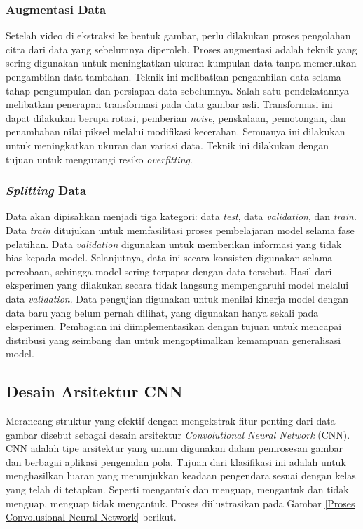 \subsubsection{Augmentasi Data}

    Setelah video di ekstraksi ke bentuk gambar, perlu dilakukan proses pengolahan citra dari data yang sebelumnya diperoleh. Proses augmentasi adalah teknik yang sering digunakan untuk meningkatkan ukuran kumpulan data tanpa memerlukan pengambilan data tambahan. Teknik ini melibatkan pengambilan data selama tahap pengumpulan dan persiapan data sebelumnya. Salah satu pendekatannya melibatkan penerapan transformasi pada data gambar asli. Transformasi ini dapat dilakukan berupa rotasi, pemberian \textit{noise}, penskalaan, pemotongan, dan penambahan nilai piksel melalui modifikasi kecerahan. Semuanya ini dilakukan untuk meningkatkan ukuran dan variasi data. Teknik ini dilakukan dengan tujuan untuk mengurangi resiko \textit{overfitting}.

\subsubsection{\textit{Splitting} Data}
   Data akan dipisahkan menjadi tiga kategori: data \textit{test}, data \textit{validation}, dan \textit{train}. Data \textit{train} ditujukan untuk memfasilitasi proses pembelajaran model selama fase pelatihan. Data \textit{validation} digunakan untuk memberikan informasi yang tidak bias kepada model. Selanjutnya, data ini secara konsisten digunakan selama percobaan, sehingga model sering terpapar dengan data tersebut. Hasil dari eksperimen yang dilakukan secara tidak langsung mempengaruhi model melalui data \textit{validation}. 
   Data pengujian digunakan untuk menilai kinerja model dengan data baru yang belum pernah dilihat, yang digunakan hanya sekali pada eksperimen. Pembagian ini diimplementasikan dengan tujuan untuk mencapai distribusi yang seimbang dan untuk mengoptimalkan kemampuan generalisasi model.

\subsection{Desain Arsitektur CNN}

    Merancang struktur yang efektif dengan mengekstrak fitur penting dari data gambar disebut sebagai desain arsitektur \textit{Convolutional Neural Network} (CNN). CNN adalah tipe arsitektur yang umum digunakan dalam pemrosesan gambar dan berbagai aplikasi pengenalan pola. Tujuan dari klasifikasi ini adalah untuk menghasilkan luaran yang menunjukkan keadaan pengendara sesuai dengan kelas yang telah di tetapkan. Seperti mengantuk dan menguap, mengantuk dan tidak menguap, menguap tidak mengantuk.  Proses diilustrasikan pada Gambar \ref{Proses Convolusional Neural Network} berikut.
 
